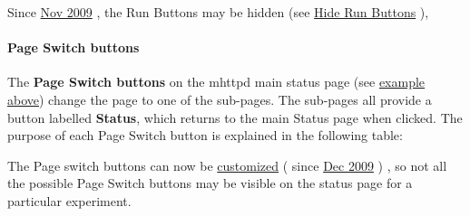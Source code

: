 \label{RC_mhttpd_status_page_features_RC_mhttpd_note1}
\hypertarget{RC_mhttpd_status_page_features_RC_mhttpd_note1}{}
  Since \hyperlink{NDF_ndf_nov_2009}{Nov 2009} , the Run Buttons may be hidden (see \hyperlink{RC_customize_ODB_RC_Experiment_tree_keys}{Hide Run Buttons} ),

\label{RC_mhttpd_status_page_features_idx_mhttpd_buttons_page-switch}
\hypertarget{RC_mhttpd_status_page_features_idx_mhttpd_buttons_page-switch}{}
 \hypertarget{RC_mhttpd_status_page_features_RC_mhttpd_status_Page_buttons}{}\paragraph{Page Switch buttons}\label{RC_mhttpd_status_page_features_RC_mhttpd_status_Page_buttons}
The {\bfseries Page Switch buttons} on the mhttpd main status page (see \hyperlink{RC_mhttpd_status_page_features_RC_mhttpd_main_status_new}{example above}) change the page to one of the sub-\/pages. The sub-\/pages all provide a button labelled {\bfseries Status}, which returns to the main Status page when clicked. The purpose of each Page Switch button is explained in the following table:

The Page switch buttons can now be \hyperlink{RC_customize_ODB_RC_ODB_Experiment_Tree}{customized} ( since \hyperlink{NDF_ndf_dec_2009}{Dec 2009} ) , so not all the possible Page Switch buttons may be visible on the status page for a particular experiment.

